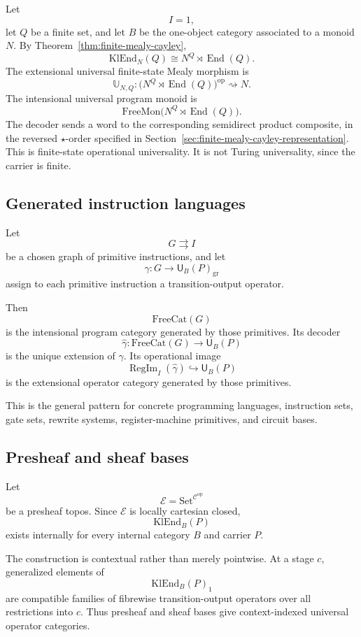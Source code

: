 Let
\[
        I=1,
\]
let \(Q\) be a finite set, and let \(B\) be the one-object category associated to a monoid \(N\).
By Theorem~\ref{thm:finite-mealy-cayley},
\[
        \mathrm{KlEnd}_N(Q)
        \cong
        N^Q\rtimes \operatorname{End}(Q).
\]
The extensional universal finite-state Mealy morphism is
\[
        \mathbb U_{N,Q}:
        \bigl(N^Q\rtimes \operatorname{End}(Q)\bigr)^{\operatorname{op}}
        \rightsquigarrow N.
\]
The intensional universal program monoid is
\[
        \mathrm{FreeMon}\bigl(N^Q\rtimes\operatorname{End}(Q)\bigr).
\]
The decoder sends a word to the corresponding semidirect product composite, in the reversed
\(\star\)-order specified in Section~\ref{sec:finite-mealy-cayley-representation}.  This is
finite-state operational universality.  It is not Turing universality, since the carrier is finite.

\subsection{Generated instruction languages}

Let
\[
        G\rightrightarrows I
\]
be a chosen graph of primitive instructions, and let
\[
        \gamma:G\to\mathsf U_B(P)_{\mathrm{gr}}
\]
assign to each primitive instruction a transition-output operator.

Then
\[
        \mathrm{FreeCat}(G)
\]
is the intensional program category generated by those primitives.  Its decoder
\[
        \widehat{\gamma}:\mathrm{FreeCat}(G)\to\mathsf U_B(P)
\]
is the unique extension of \(\gamma\).  Its operational image
\[
        \operatorname{RegIm}_I(\widehat{\gamma})
        \hookrightarrow
        \mathsf U_B(P)
\]
is the extensional operator category generated by those primitives.

This is the general pattern for concrete programming languages, instruction sets, gate sets,
rewrite systems, register-machine primitives, and circuit bases.

\subsection{Presheaf and sheaf bases}

Let
\[
        \mathcal E=\mathrm{Set}^{\mathcal C^{\operatorname{op}}}
\]
be a presheaf topos.  Since \(\mathcal E\) is locally cartesian closed,
\[
        \mathrm{KlEnd}_B(P)
\]
exists internally for every internal category \(B\) and carrier \(P\).

The construction is contextual rather than merely pointwise.  At a stage \(c\), generalized
elements of
\[
        \mathrm{KlEnd}_B(P)_1
\]
are compatible families of fibrewise transition-output operators over all restrictions into \(c\).
Thus presheaf and sheaf bases give context-indexed universal operator categories.

